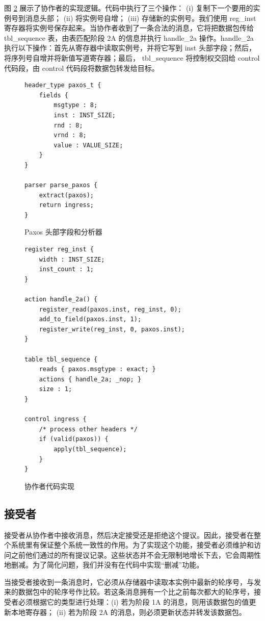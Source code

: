 \documentclass[conference]{IEEEtran}
\begin{document}
图 \ref{l4} 展示了协作者的实现逻辑。代码中执行了三个操作： (i) 复制下一个要用的实例号到消息头部； (ii) 将实例号自增； (iii) 存储新的实例号。我们使用 reg\_inst 寄存器将实例号保存起来。当协作者收到了一条合法的消息，它将把数据包传给 tbl\_sequence 表，由表匹配阶段 2A 的信息并执行 handle\_2a 操作。handle\_2a 执行以下操作：首先从寄存器中读取实例号，并将它写到 inst 头部字段；然后，将序列号自增并将新值写道寄存器；最后， tbl\_sequence 将控制权交回给 control 代码段，由 control 代码段将数据包转发给目标。

\begin{figure}
\centering
\begin{lstlisting}
header_type paxos_t {
	fields {
		msgtype : 8;
		inst : INST_SIZE;
		rnd : 8;
		vrnd : 8;
		value : VALUE_SIZE;
	}
}

parser parse_paxos {
	extract(paxos);
	return ingress;
}
\end{lstlisting}
\caption{Paxos 头部字段和分析器}
\label{l3}
\end{figure}

\begin{figure}
\centering
\begin{lstlisting}
register reg_inst {
	width : INST_SIZE;
	inst_count : 1;
}

action handle_2a() {
	register_read(paxos.inst, reg_inst, 0);
	add_to_field(paxos.inst, 1);
	register_write(reg_inst, 0, paxos.inst);
}

table tbl_sequence {
	reads { paxos.msgtype : exact; }
	actions { handle_2a; _nop; }
	size : 1;
}

control ingress {
	/* process other headers */
	if (valid(paxos)) {
		apply(tbl_sequence);
	}
}
\end{lstlisting}
\caption{协作者代码实现}
\label{l4}
\end{figure}

\subsection{接受者}

接受者从协作者中接收消息，然后决定接受还是拒绝这个提议。因此，接受者在整个系统里有保证整个系统一致性的作用。为了实现这个功能，接受者必须维护和访问之前他们通过的所有提议记录。这些状态并不会无限制地增长下去，它会周期性地删减。为了简化问题，我们并没有在代码中实现“删减”功能。

当接受者接收到一条消息时，它必须从存储器中读取本实例中最新的轮序号，与发来的数据包中的轮序号作比较。若这条消息拥有一个比之前每次都大的轮序号，接受者必须根据它的类型进行处理：(i) 若为阶段 1A 的消息，则用该数据包的值更新本地寄存器； (ii) 若为阶段 2A 的消息，则必须更新状态并转发该数据包。
\end{document}
